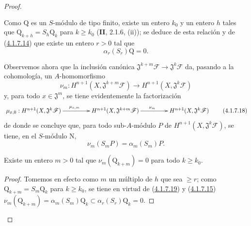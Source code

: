 \begin{proof}
\begin{env}[4.1.7.13]
Como $\mathrm Q$ es un $S$-módulo de tipo finito, existe un entero
$k_0$ y un entero $h$ tales que
$\mathrm Q_{k+h}=S_h\mathrm Q_k$ para $k\geq k_0$ (\textbf{II}, 2.1.6, (ii));
se deduce de esta relación y de
(\hyperref[III.4.1.7.14-fr]{4.1.7.14}) que existe un entero $r>0$ tal
que
\[
\alpha_r(S_r)\mathrm Q=0.
\tag{4.1.7.15}\label{III.4.1.7.15-fr}
\]
\end{env}

\begin{env}[4.1.7.16]
\label{III.4.1.7.16-fr}
Observemos ahora que la inclusión canónica
$\mathfrak J^{k+m}\mathcal F\to\mathfrak J^k\mathcal F$ da, pasando
a la cohomología, un $A$-homomorfismo
\[
\nu_m:H^{n+1}(X,\mathfrak J^{k+m}\mathcal F)
\longrightarrow H^{n+1}(X,\mathfrak J^k\mathcal F)
\tag{4.1.7.17}\label{III.4.1.7.17-fr}
\]
y, para todo $x\in\mathfrak J^m$, se tiene evidentemente la factorización
\[
\xymatrix@C=4.5em{
\mu_{x,0}:H^{n+1}(X,\mathfrak J^k\mathcal F)\ar[r]^{\mu_{x,m}}&
H^{n+1}(X,\mathfrak J^{k+m}\mathcal F)\ar[r]^{\nu_m}&
H^{n+1}(X,\mathfrak J^k\mathcal F)
}
\tag{4.1.7.18}\label{III.4.1.7.18-fr}
\]
de donde se concluye que, para todo sub-$A$-módulo $P$ de
$H^{n+1}(X,\mathfrak J^k\mathcal F)$, se tiene, en el $S$-módulo
$\mathrm N$,
\[
\nu_m(S_mP)=\alpha_m(S_m)P.
\tag{4.1.7.19}\label{III.4.1.7.19-fr}
\]
\end{env}

\begin{lemma}[4.1.7.20]
\label{III.4.1.7.20-fr}
Existe un entero $m>0$ tal que $\nu_m(\mathrm Q_{k+m})=0$ para todo
$k\geq k_0$.
\end{lemma}

\begin{proof}
Tomemos en efecto como $m$ un múltiplo de $h$ que sea $\geq r$; como
$\mathrm Q_{k+m}=S_m\mathrm Q_k$ para $k\geq k_0$, se tiene en virtud de
(\hyperref[III.4.1.7.19-fr]{4.1.7.19}) y
(\hyperref[III.4.1.7.15-fr]{4.1.7.15})
$\nu_m(\mathrm Q_{k+m})=\alpha_m(S_m)\mathrm Q_k
\subset\alpha_r(S_r)\mathrm Q_k=0$.
\end{proof}


\end{proof}
